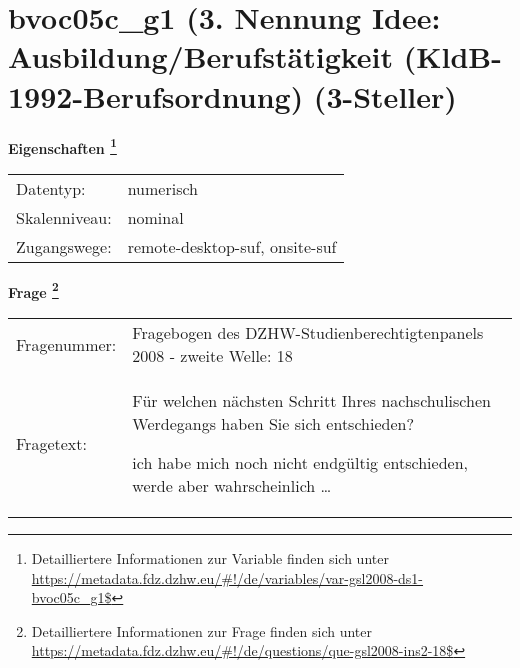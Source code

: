 
    \setcounter{footnote}{0}

    \vspace*{-1.8cm}
	\section{bvoc05c\_g1 (3. Nennung Idee: Ausbildung/Berufstätigkeit (KldB-1992-Berufsordnung) (3-Steller)}
	\label{section:bvoc05c_g1}



    \vspace*{0.5cm}
    \noindent\textbf{Eigenschaften
	\footnote{Detailliertere Informationen zur Variable finden sich unter
		\url{https://metadata.fdz.dzhw.eu/\#!/de/variables/var-gsl2008-ds1-bvoc05c_g1$}}}\\
	\begin{tabularx}{\hsize}{@{}lX}
	Datentyp: & numerisch \\
	Skalenniveau: & nominal \\
	Zugangswege: &
	  remote-desktop-suf, 
	  onsite-suf
 \\
    \end{tabularx}



				\vspace*{0.5cm}
                \noindent\textbf{Frage
	                \footnote{Detailliertere Informationen zur Frage finden sich unter
		              \url{https://metadata.fdz.dzhw.eu/\#!/de/questions/que-gsl2008-ins2-18$}}}\\
				\begin{tabularx}{\hsize}{@{}lX}
					Fragenummer: &
					  Fragebogen des DZHW-Studienberechtigtenpanels 2008 - zweite Welle:
					  18
 \\
					Fragetext: & Für welchen nächsten Schritt Ihres nachschulischen Werdegangs haben Sie sich entschieden?\par  ich habe mich noch nicht endgültig entschieden, werde aber wahrscheinlich … \\
				\end{tabularx}





